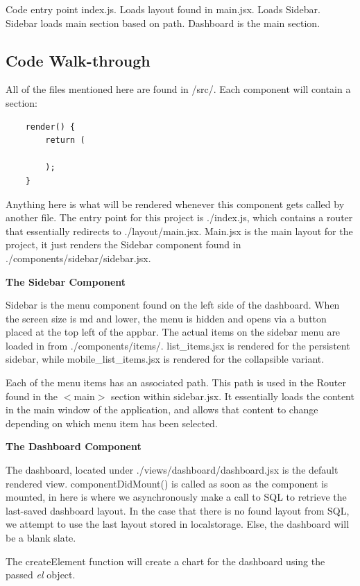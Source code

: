 \documentclass[12pt, titlepage]{article}
\begin{document}
Code entry point index.js. Loads layout found in main.jsx. Loads Sidebar. Sidebar loads main section based on path. Dashboard is the main section.

\subsection{Code Walk-through}

All of the files mentioned here are found in /src/. Each component will contain a section: 
\begin{verbatim}
    render() {
        return (

        );
    }
\end{verbatim}
\noindent Anything here is what will be rendered whenever this component gets called by another file. The entry point for this project is ./index.js, which contains a router that essentially redirects to ./layout/main.jsx. Main.jsx is the main layout for the project, it just renders the Sidebar component found in ./components/sidebar/sidebar.jsx.

\textbf{The Sidebar Component}

\noindent Sidebar is the menu component found on the left side of the dashboard. When the screen size is md and lower, the menu is hidden and opens via a button placed at the top left of the appbar. The actual items on the sidebar menu are loaded in from ./components/items/. list\_items.jsx is rendered for the persistent sidebar, while mobile\_list\_items.jsx is rendered for the collapsible variant.

\noindent Each of the menu items has an associated path. This path is used in the Router found in the $<$main$>$ section within sidebar.jsx. It essentially loads the content in the main window of the application, and allows that content to change depending on which menu item has been selected.

\textbf{The Dashboard Component}

\noindent The dashboard, located under ./views/dashboard/dashboard.jsx is the default rendered view. componentDidMount() is called as soon as the component is mounted, in here is where we asynchronously make a call to SQL to retrieve the last-saved dashboard layout. In the case that there is no found layout from SQL, we attempt to use the last layout stored in localstorage. Else, the dashboard will be a blank slate.

\noindent The createElement function will create a chart for the dashboard using the passed \textit{el} object. 
\end{document}
